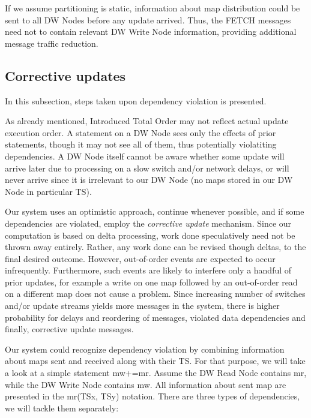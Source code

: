 \documentclass{sig-semester}
\def\EXORD{actual update execution order\xspace}
\begin{document}
If we assume partitioning is static, information about map distribution could be sent to all DW Nodes before any update arrived. Thus, the FETCH messages need not to contain relevant DW Write Node information, providing additional message traffic reduction.

\subsection{Corrective updates}
\label{Corrective}
In this subsection, steps taken upon dependency violation is presented. 

As already mentioned, Introduced Total Order may not reflect \EXORD. A statement on a DW Node sees only the effects of prior statements, though it may not see all of them, thus potentially violatiting dependencies. A DW Node itself cannot be aware whether some update will arrive later due to processing on a slow switch and/or network delays, or will never arrive since it is irrelevant to our DW Node (no maps stored in our DW Node in particular TS).

Our system uses an optimistic approach, continue whenever possible, and if some dependencies are violated, employ the \textit{corrective update} mechanism. Since our computation is based on delta processing, work done speculatively need not be thrown away entirely. Rather, any work done can be revised though deltas, to the final desired outcome. However, out-of-order events are expected to occur infrequently. Furthermore, such events are likely to interfere only a handful of prior updates, for example a write on one map followed by an out-of-order read on a different map does not cause a problem. Since increasing number of switches and/or update streams yields more messages in the system, there is higher probability for delays and reordering of messages, violated data dependencies and finally, corrective update messages.

Our system could recognize dependency violation by combining information about maps sent and received along with their TS. For that purpose, we will take a look at a simple statement mw+=mr. Assume the DW Read Node contains mr, while the DW Write Node contains mw. All information about sent map are presented in the mr(TSx, TSy) notation. There are three types of dependencies, we will tackle them separately:
\end{document}
